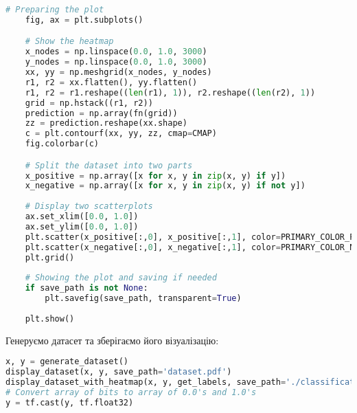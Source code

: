 \begin{lstlisting}[language=Python]
    # Preparing the plot
    fig, ax = plt.subplots()

    # Show the heatmap
    x_nodes = np.linspace(0.0, 1.0, 3000)
    y_nodes = np.linspace(0.0, 1.0, 3000)
    xx, yy = np.meshgrid(x_nodes, y_nodes)
    r1, r2 = xx.flatten(), yy.flatten()
    r1, r2 = r1.reshape((len(r1), 1)), r2.reshape((len(r2), 1))
    grid = np.hstack((r1, r2))
    prediction = np.array(fn(grid))
    zz = prediction.reshape(xx.shape)
    c = plt.contourf(xx, yy, zz, cmap=CMAP)
    fig.colorbar(c)

    # Split the dataset into two parts
    x_positive = np.array([x for x, y in zip(x, y) if y])
    x_negative = np.array([x for x, y in zip(x, y) if not y])
    
    # Display two scatterplots
    ax.set_xlim([0.0, 1.0])
    ax.set_ylim([0.0, 1.0])
    plt.scatter(x_positive[:,0], x_positive[:,1], color=PRIMARY_COLOR_POSITIVE, edgecolors='black')
    plt.scatter(x_negative[:,0], x_negative[:,1], color=PRIMARY_COLOR_NEGATIVE, edgecolors='black')
    plt.grid()
    
    # Showing the plot and saving if needed
    if save_path is not None:
        plt.savefig(save_path, transparent=True)
    
    plt.show()
\end{lstlisting}

Генеруємо датасет та зберігаємо його візуалізацію:
\begin{lstlisting}[language=Python]
x, y = generate_dataset()
display_dataset(x, y, save_path='dataset.pdf')
display_dataset_with_heatmap(x, y, get_labels, save_path='./classification-example.pdf')
# Convert array of bits to array of 0.0's and 1.0's
y = tf.cast(y, tf.float32)
\end{lstlisting}

